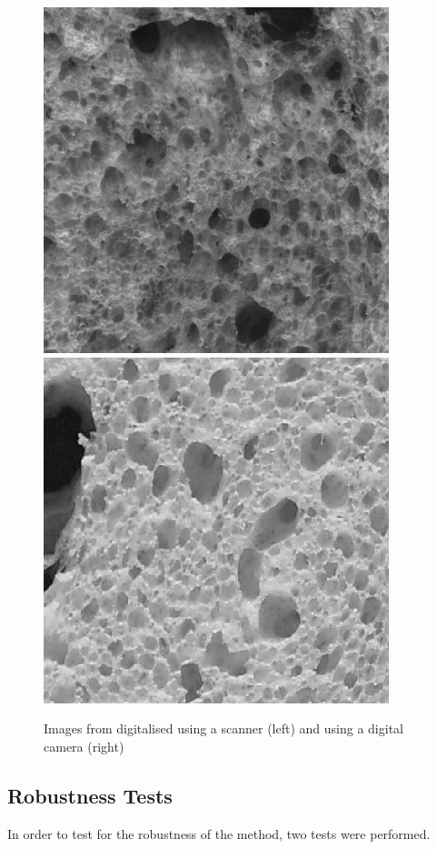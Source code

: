 \documentclass[oneside,a4paper,english,links]{amca}
\begin{document}
\begin{figure}[htb]
\centering
\includegraphics[scale=0.28]{imagenes/gonzales/allied1}
\includegraphics[scale=0.28]{imagenes/gonzales/allied2c}
\caption{Images from \cite{Gonzales2008} digitalised using a scanner (left) and using a digital camera (right)}
\label{fig:gonzales}
\end{figure}

\subsection{Robustness Tests}
In order to test for the robustness of the method, two tests were performed. 
\end{document}
